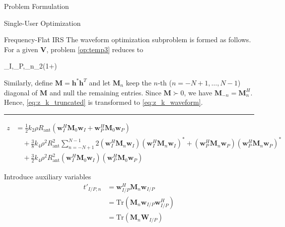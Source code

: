 \documentclass{IEEEtran}
\begin{document}
\begin{section}{Problem Formulation}
\begin{subsection}{Single-User Optimization}
\begin{subsubsection}{Frequency-Flat IRS}
			The waveform optimization subproblem is formed as follows. For a given $\boldsymbol{V}$, problem \ref{op:temp3} reduces to
			\begin{maxi}
				{\boldsymbol{w}_I,_P,\rho}{\sum_{n}{\log_2\left(1+\right)}}{\label{op:temp5}}{}
			\end{maxi}
			Similarly, define $\boldsymbol{M}=\boldsymbol{h}^*\boldsymbol{h}^T$ and let $\boldsymbol{M}_n$ keep the $n$-th ($n=-N+1,\dots,N-1$) diagonal of $\boldsymbol{M}$ and null the remaining entries. Since $\boldsymbol{M} \succ 0$, we have $\boldsymbol{M}_{-n}=\boldsymbol{M}_n^H$. Hence, \ref{eq:z_k_truncated} is transformed to \ref{eq:z_k_waveform}.
			\begin{figure*}[b]
				\hrule
				\begin{equation}\label{eq:z_k_waveform}
					\begin{split}
						z
						&=\frac{1}{2}{k_2}{\rho}{R_{\text{ant}}}(\boldsymbol{w}_I^H\boldsymbol{M}_0\boldsymbol{w}_I+\boldsymbol{w}_P^H\boldsymbol{M}_0\boldsymbol{w}_P)\\
						&\quad+\frac{3}{8}{k_4}{\rho^2}{R_{\text{ant}}^2}\sum_{n=-N+1}^{N-1}{2(\boldsymbol{w}_I^H\boldsymbol{M}_{n}\boldsymbol{w}_I)(\boldsymbol{w}_I^H\boldsymbol{M}_{n}\boldsymbol{w}_I)^*+(\boldsymbol{w}_P^H\boldsymbol{M}_{n}\boldsymbol{w}_P)(\boldsymbol{w}_P^H\boldsymbol{M}_{n}\boldsymbol{w}_P)^*}\\
						&\quad+\frac{3}{2}{k_4}{\rho^2}{R_{\text{ant}}^2}{(\boldsymbol{w}_I^H\boldsymbol{M}_{0}\boldsymbol{w}_I)(\boldsymbol{w}_P^H\boldsymbol{M}_{0}\boldsymbol{w}_P)}
					\end{split}
				\end{equation}
			\end{figure*}
			Introduce auxiliary variables
			\begin{equation}\label{eq:t'}
				\begin{split}
					t'_{I/P,n}
					& = \boldsymbol{w}_{I/P}^H\boldsymbol{M}_{n}\boldsymbol{w}_{I/P}\\
					& = \mathrm{Tr}(\boldsymbol{M}_{n}\boldsymbol{w}_{I/P}\boldsymbol{w}_{I/P}^H)\\
					& = \mathrm{Tr}(\boldsymbol{M}_{n}\boldsymbol{W}_{I/P})
				\end{split}
			\end{equation}

\end{subsubsection}
\end{subsection}
\end{section}
\end{document}
